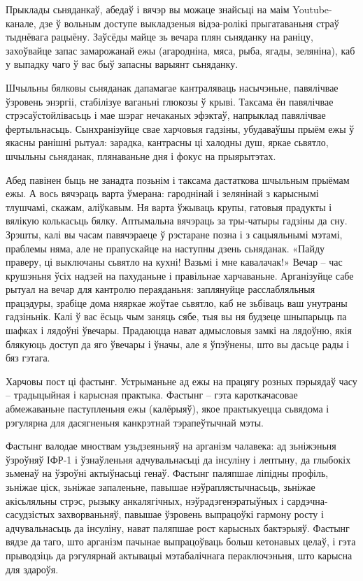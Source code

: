 Прыклады сьняданкаў, абедаў і вячэр вы можаце знайсьці на маім Youtube-канале, дзе ў вольным доступе выкладзеныя відэа-ролікі прыгатаваньня страў тыднёвага рацыёну. Заўсёды майце зь вечара плян сьняданку на раніцу, захоўвайце запас замарожанай ежы (агародніна, мяса, рыба, ягады, зеляніна), каб у выпадку чаго ў вас быў запасны варыянт сьняданку.

Шчыльны бялковы сьняданак дапамагае кантраляваць насычэньне, павялічвае ўзровень энэргіі, стабілізуе ваганьні глюкозы ў крыві. Таксама ён павялічвае стрэсаўстойлівасьць і мае шэраг нечаканых эфэктаў, напрыклад павялічвае фертыльнасьць. Сынхранізуйце свае харчовыя гадзіны, убудаваўшы прыём ежы ў якасны ранішні рытуал: зарадка, кантрасны ці халодны душ, яркае сьвятло, шчыльны сьняданак, плянаваньне дня і фокус на прыярытэтах.

Абед павінен быць не занадта позьнім і таксама дастаткова шчыльным прыёмам ежы. А вось вячэраць варта ўмерана: гароднінай і зелянінай з карыснымі тлушчамі, скажам, аліўкавым. Ня варта ўжываць крупы, гатовыя прадукты і вялікую колькасьць бялку. Аптымальна вячэраць за тры-чатыры гадзіны да сну. Зрэшты, калі вы часам павячэраеце ў рэстаране позна і з сацыяльнымі мэтамі, праблемы няма, але не прапускайце на наступны дзень сьняданак. «Пайду праверу, ці выключаны сьвятло на кухні! Вазьмі і мне кавалачак!» Вечар – час крушэньня ўсіх надзей на пахуданьне і правільнае харчаваньне. Арганізуйце сабе рытуал на вечар для кантролю пераяданьня: заплянуйце расслабляльныя працэдуры, зрабіце дома няяркае жоўтае сьвятло, каб не зьбіваць ваш унутраны гадзіньнік. Калі ў вас ёсьць чым заняць сябе, тыя вы ня будзеце шныпарыць па шафках і лядоўні ўвечары. Прадаюцца нават адмысловыя замкі на лядоўню, якія блякуюць доступ да яго ўвечары і ўначы, але я ўпэўнены, што вы дасьце рады і бяз гэтага.

Харчовы пост ці фастынг. Устрыманьне ад ежы на працягу розных пэрыядаў часу – традыцыйная і карысная практыка. Фастынг – гэта кароткачасовае абмежаваньне паступленьня ежы (калёрыяў), якое практыкуецца сьвядома і рэгулярна для дасягненьня канкрэтнай тэрапеўтычнай мэты.

Фастынг валодае мноствам узьдзеяньняў на арганізм чалавека: ад зьніжэньня ўзроўняў ІФР-1 і ўзнаўленьня адчувальнасьці да інсуліну і лептыну, да глыбокіх зьменаў на ўзроўні актыўнасьці генаў. Фастынг паляпшае ліпідны профіль, зьніжае ціск, зьніжае запаленьне, павышае нэўраплястычнасьць, зьніжае акісьляльны стрэс, рызыку анкалягічных, нэўрадэгенэратыўных і сардэчна-сасудзістых захворваньняў, павышае ўзровень выпрацоўкі гармону росту і адчувальнасьць да інсуліну, нават паляпшае рост карысных бактэрыяў. Фастынг вядзе да таго, што арганізм пачынае выпрацоўваць больш кетонавых целаў, і гэта прыводзіць да рэгулярнай актывацыі мэтабалічнага пераключэньня, што карысна для здароўя.

